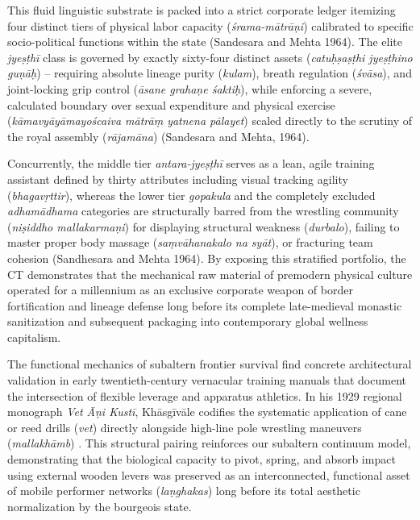\documentclass[11pt,twoside,letterpaper]{article}
\begin{document}
This fluid linguistic substrate is packed into a strict corporate ledger itemizing four distinct tiers of physical labor capacity (\textit{śrama-mātrāṇi}) calibrated to specific socio-political functions within the state (Sandesara and Mehta 1964). The elite \textit{jyeṣṭhī} class is governed by exactly sixty-four distinct assets (\textit{catuḥṣaṣṭhi jyeṣṭhino guṇāḥ}) -- requiring absolute lineage purity (\textit{kulam}), breath regulation (\textit{śvāsa}), and joint-locking grip control (\textit{āsane grahaṇe śaktiḥ}), while enforcing a severe, calculated boundary over sexual expenditure and physical exercise (\textit{kāmavyāyāmayoścaiva mātrāṃ yatnena pālayet}) scaled directly to the scrutiny of the royal assembly (\textit{rājamāna}) (Sandesara and Mehta, 1964).

Concurrently, the middle tier \textit{antara-jyeṣṭhī} serves as a lean, agile training assistant defined by thirty attributes including visual tracking agility (\textit{bhagavṛttir}), whereas the lower tier \textit{gopakula} and the completely excluded \textit{adhamādhama} categories are structurally barred from the wrestling community (\textit{niṣiddho mallakarmaṇi}) for displaying structural weakness (\textit{durbalo}), failing to master proper body massage (\textit{saṃvāhanakalo na syāt}), or fracturing team cohesion (Sandhesara and Mehta 1964). By exposing this stratified portfolio, the CT demonstrates that the mechanical raw material of premodern physical culture operated for a millennium as an exclusive corporate weapon of border fortification and lineage defense long before its complete late-medieval monastic sanitization and subsequent packaging into contemporary global wellness capitalism.

The functional mechanics of subaltern frontier survival find concrete architectural validation in early twentieth-century vernacular training manuals that document the intersection of flexible leverage and apparatus athletics. In his 1929 regional monograph \textit{Vet Āṇi Kustī}, Khāsgīvāle codifies the systematic application of cane or reed drills (\textit{vet}) directly alongside high-line pole wrestling maneuvers (\textit{mallakhāmb}) \citep{Khasgivale1929}. This structural pairing reinforces our subaltern continuum model, demonstrating that the biological capacity to pivot, spring, and absorb impact using external wooden levers was preserved as an interconnected, functional asset of mobile performer networks (\textit{laṇghakas}) long before its total aesthetic normalization by the bourgeois state.
\end{document}
